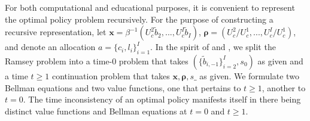 \documentclass[thmsb,11pt]{article}
\begin{document}
For both computational and educational purposes, it is convenient to represent the optimal policy problem recursively.  For the purpose of constructing a recursive representation, let $\bm{x}= \beta^{-1}\left( U_{c}^{2}\tilde{b}_{2},...,U_{c}^{I}\tilde{b}_{I}\right)$, $\bm{\rho }=\left( U_{c}^{2}/U_{c}^{1},...,U_{c}^{I}/U_{c}^{1}\right) $, and denote an allocation $a=\{c_i,l_i\}^{I}_{i=1}.$
In the spirit of \cite{Kydland1980} and \cite{Farhi2010}, we split the Ramsey problem into a time-$0$ problem that takes $(\{\tilde{b}_{i,-1}\}^{I}_{i=2}, s_0)$ as given and   a time $t \geq 1$ continuation problem  that takes $\bm x,\bm \rho,s\_$ as given. We formulate
two Bellman equations and two value functions, one that pertains to $t\geq 1$, another to $t=0$.  The time inconsistency of an optimal policy
manifests itself in there being distinct value functions and Bellman equations at $t =0$ and $t \geq 1$.
\end{document}
